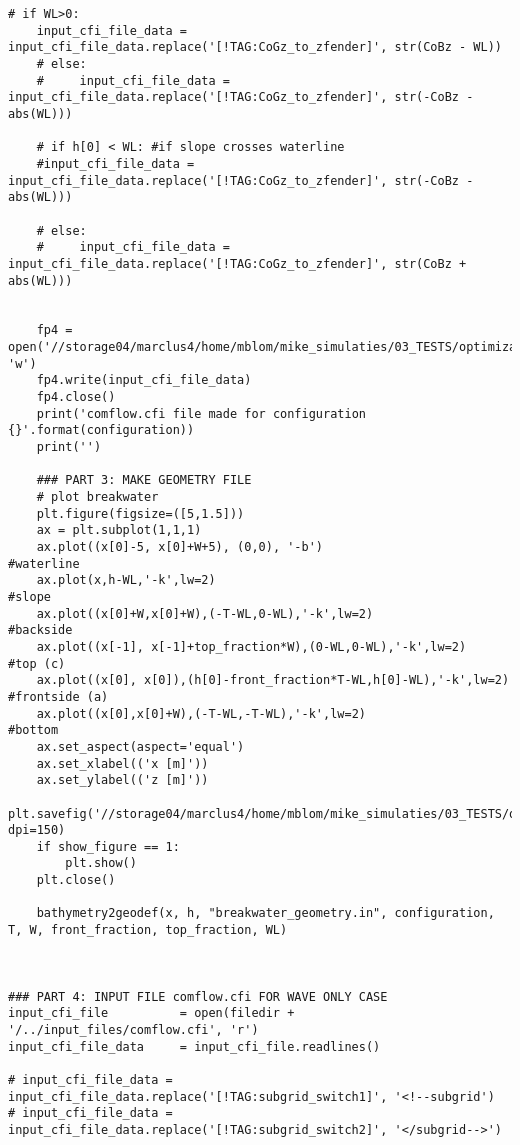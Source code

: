 \begin{mdframed}[backgroundcolor=light-gray, roundcorner=10pt,leftmargin=1, rightmargin=1, innerleftmargin=0, innertopmargin=7,innerbottommargin=0, outerlinewidth=1, linecolor=light-gray]
\begin{lstlisting}[linewidth=\columnwidth,caption= Script for creating comflow.cfi and  breakwater.in files ., label=script: creating comflow.cfi and breakwater.in]
    # if WL>0:
    input_cfi_file_data = input_cfi_file_data.replace('[!TAG:CoGz_to_zfender]', str(CoBz - WL))
    # else:
    #     input_cfi_file_data = input_cfi_file_data.replace('[!TAG:CoGz_to_zfender]', str(-CoBz - abs(WL)))

    # if h[0] < WL: #if slope crosses waterline
    #input_cfi_file_data = input_cfi_file_data.replace('[!TAG:CoGz_to_zfender]', str(-CoBz - abs(WL)))

    # else:
    #     input_cfi_file_data = input_cfi_file_data.replace('[!TAG:CoGz_to_zfender]', str(CoBz + abs(WL)))


    fp4 = open('//storage04/marclus4/home/mblom/mike_simulaties/03_TESTS/optimization_clusterfolder/ComFLOW_simulations/configuration_{}/input_files/comflow.cfi'.format(configuration), 'w')
    fp4.write(input_cfi_file_data)
    fp4.close()
    print('comflow.cfi file made for configuration {}'.format(configuration))
    print('')

    ### PART 3: MAKE GEOMETRY FILE
    # plot breakwater
    plt.figure(figsize=([5,1.5]))
    ax = plt.subplot(1,1,1)
    ax.plot((x[0]-5, x[0]+W+5), (0,0), '-b')                            #waterline
    ax.plot(x,h-WL,'-k',lw=2)                                           #slope
    ax.plot((x[0]+W,x[0]+W),(-T-WL,0-WL),'-k',lw=2)                     #backside
    ax.plot((x[-1], x[-1]+top_fraction*W),(0-WL,0-WL),'-k',lw=2)        #top (c)
    ax.plot((x[0], x[0]),(h[0]-front_fraction*T-WL,h[0]-WL),'-k',lw=2)  #frontside (a)
    ax.plot((x[0],x[0]+W),(-T-WL,-T-WL),'-k',lw=2)                      #bottom
    ax.set_aspect(aspect='equal')
    ax.set_xlabel(('x [m]'))
    ax.set_ylabel(('z [m]'))
    plt.savefig('//storage04/marclus4/home/mblom/mike_simulaties/03_TESTS/optimization_clusterfolder/ComFLOW_simulations/configuration_{}/input_files/breakwater_geometry{}.pdf'.format(configuration,configuration), dpi=150)
    if show_figure == 1:
        plt.show()
    plt.close()

    bathymetry2geodef(x, h, "breakwater_geometry.in", configuration, T, W, front_fraction, top_fraction, WL)



### PART 4: INPUT FILE comflow.cfi FOR WAVE ONLY CASE
input_cfi_file          = open(filedir + '/../input_files/comflow.cfi', 'r')
input_cfi_file_data     = input_cfi_file.readlines()

# input_cfi_file_data = input_cfi_file_data.replace('[!TAG:subgrid_switch1]', '<!--subgrid')
# input_cfi_file_data = input_cfi_file_data.replace('[!TAG:subgrid_switch2]', '</subgrid-->')


\end{lstlisting}
\end{mdframed}
